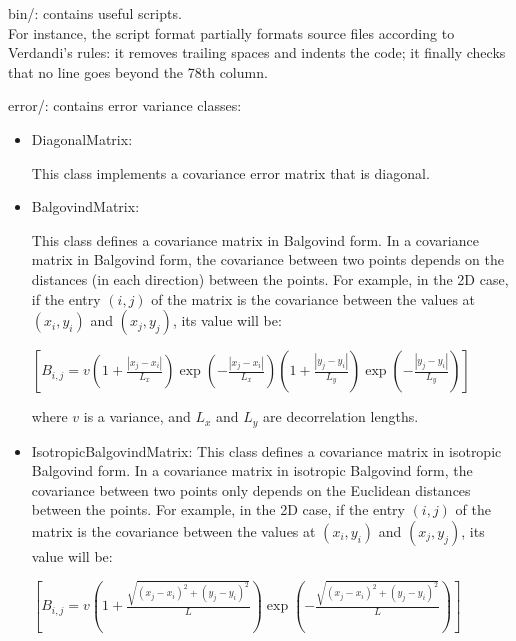 \documentclass{tufte-book}
\newcounter{points}
\begin{document}
\begin{DoxyItemize}
\item {\ttfamily bin/}\-: contains useful scripts.\\

For instance,  \-the script {\ttfamily format} partially formats source files according to \-Verdandi's rules\-: 
it removes trailing spaces and indents the code; it finally checks that no line goes beyond the 78th column.
\item {\ttfamily error/}\-: contains error variance classes:
	\begin{itemize}
	\item  {\ttfamily \-Diagonal\-Matrix}:

	This class implements a covariance error matrix that is
      diagonal.
	\item  {\ttfamily \-Balgovind\-Matrix}:

	This class defines a covariance matrix in Balgovind form.
      In a covariance matrix in Balgovind form, the covariance between two
      points depends on the distances (in each direction) between the
      points. For example, in the 2D case, if the entry $(i, j)$ of the
      matrix is the covariance between the values at $(x_i, y_i)$ and
      $(x_j, y_j)$, its value will be:

      $[B_{i, j} = v \left(1 + \frac{|x_j - x_i|}{L_x}\right)
      \exp\left(-\frac{|x_j - x_i|}{L_x}\right) \left(1 + \frac{|y_j -
      y_i|}{L_y}\right) \exp\left(-\frac{|y_j - y_i|}{L_y}\right)]$

      where $v$ is a variance, and $L_x$ and $L_y$ are
      decorrelation lengths.
	\item  {\ttfamily \-IsotropicBalgovind\-Matrix}:
	This class defines a covariance matrix in isotropic Balgovind form.
     In a covariance matrix in isotropic Balgovind form, the covariance
      between two points only depends on the Euclidean distances between the
      points. For example, in the 2D case, if the entry $(i, j)$ of the
      matrix is the covariance between the values at $(x_i, y_i)$ and
      $(x_j, y_j)$, its value will be:

     $ [B_{i, j} = v \left(1 + \frac{\sqrt{(x_j - x_i)^2 + (y_j -
      y_i)^2}}{L}\right) \exp\left(-\frac{\sqrt{(x_j - x_i)^2 + (y_j -
      y_i)^2}}{L}\right)]$


\end{itemize}
\end{DoxyItemize}
\end{document}
